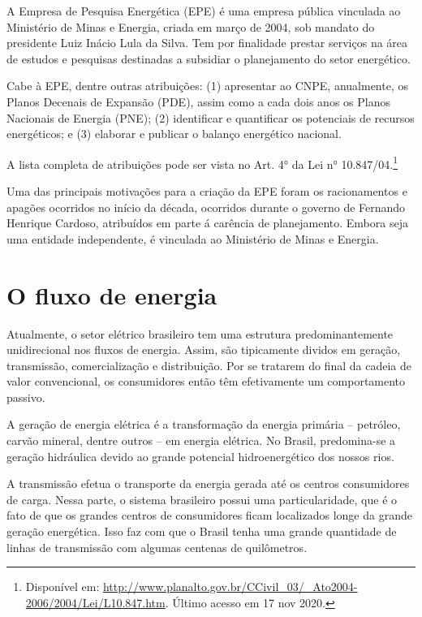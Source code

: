 \documentclass[aprovado,numbers]{coppe}
\begin{document}
  A Empresa de Pesquisa Energética (EPE) é uma empresa pública vinculada ao Ministério de Minas e Energia, criada em março de 2004, sob mandato do presidente Luiz Inácio Lula da Silva. Tem por finalidade prestar serviços na área de estudos e pesquisas destinadas a subsidiar o planejamento do setor energético.

  Cabe à EPE, dentre outras atribuições: (1) apresentar ao CNPE, anualmente, os Planos Decenais de Expansão (PDE), assim como a cada dois anos os Planos Nacionais de Energia (PNE); (2) identificar e quantificar os potenciais de recursos energéticos; e (3) elaborar e publicar o balanço energético nacional.

  A lista completa de atribuições pode ser vista no Art. 4° da Lei n° 10.847/04.\footnote{Disponível em: \url{http://www.planalto.gov.br/CCivil_03/_Ato2004-2006/2004/Lei/L10.847.htm}. Último acesso em 17 nov 2020.}

  Uma das principais motivações para a criação da EPE foram os racionamentos e apagões ocorridos no início da década, ocorridos durante o governo de Fernando Henrique Cardoso, atribuídos em parte á carência de planejamento. Embora seja uma entidade independente, é vinculada ao Ministério de Minas e Energia.

  \hypertarget{o-fluxo-de-energia}{%
  \section{O fluxo de energia}\label{o-fluxo-de-energia}}

  Atualmente, o setor elétrico brasileiro tem uma estrutura predominantemente unidirecional nos fluxos de energia. Assim, são tipicamente dividos em geração, transmissão, comercialização e distribuição. Por se tratarem do final da cadeia de valor convencional, os consumidores então têm efetivamente um comportamento passivo.

  A geração de energia elétrica é a transformação da energia primária -- petróleo, carvão mineral, dentre outros -- em energia elétrica. No Brasil, predomina-se a geração hidráulica devido ao grande potencial hidroenergético dos nossos rios.

  A transmissão efetua o transporte da energia gerada até os centros consumidores de carga. Nessa parte, o sistema brasileiro possui uma particularidade, que é o fato de que os grandes centros de consumidores ficam localizados longe da grande geração energética. Isso faz com que o Brasil tenha uma grande quantidade de linhas de transmissão com algumas centenas de quilômetros.
\end{document}
